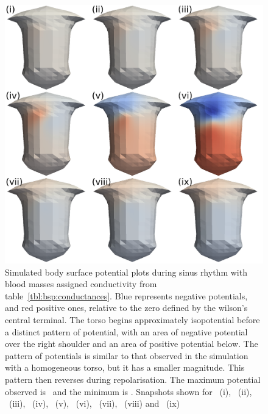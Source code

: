 \begin{figure}
\includegraphics{figures/bsp/bsp_blood}
\caption[Body Surface Potential snapshots, with blood masses]{
\label{bsp:fig:blood_bsp}
Simulated body surface potential plots during sinus rhythm with blood masses assigned
conductivity from table~\ref{tbl:bsp:conductances}.
Blue represents negative potentials, and red positive ones, relative to the zero
defined by the wilson's central terminal.
The torso begins approximately isopotential before a distinct pattern of
potential, with an area of negative potential over the right shoulder and an
area of positive potential below.
The pattern of potentials is similar to that observed in the simulation with a
homogeneous torso, but it has a smaller magnitude.
This pattern then reverses during repolarisation.
The maximum potential observed is \ and the minimum is .
Snapshots shown for \ (i), \ (ii), \ (iii), \ (iv),
\ (v), \ (vi), \ (vii), \ (viii) and \
(ix)
}
\end{figure}

